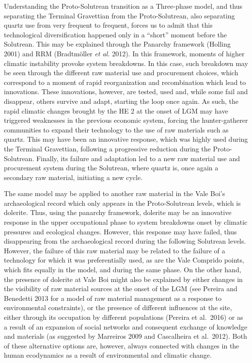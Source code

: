 \documentclass[12pt,twoside]{reedthesis}
\begin{document}
Understanding the Proto-Solutrean transition as a Three-phase model, and thus separating the Terminal Gravettian from the Proto-Solutrean, also separating quartz use from very frequent to frequent, forces us to admit that this technological diversification happened only in a ``short'' moment before the Solutrean. This may be explained through the Panarchy framework (Holling 2001) and RRM (Bradtmöller \emph{et al.} 2012). In this framework, moments of higher climatic instability provoke system breakdowns. In this case, such breakdown may be seen through the different raw material use and procurement choices, which correspond to a moment of rapid reorganization and recombination which lead to innovations. These innovations, however, are tested, used and, while some fail and disappear, others survive and adapt, starting the loop once again. As such, the rapid climatic changes brought by the HE 2 at the onset of LGM may have triggered weaknesses in the previous economic system, forcing the hunter-gatherer communities to expand their technology to the use of raw materials such as quartz. This may have been an innovative response, which was highly used during the Terminal Gravettian, following a progressive reduction during the Proto-Solutrean. Finally, its failure and adaptation led to a new raw material use and procurement system during the Solutrean, where quartz is, once again a secondary raw material, initiating a new cycle.

The same model may be applied to another raw material in the Vale Boi's archaeological record which only appears in the Proto-Solutrean levels, which is dolerite. Thus, using the panarchy framework, dolerite may be an innovative response in the upper occupational phase to system breakdowns onset by climatic pressures and ecological changes. However, this response may have failed, thus disappearing from the archaeological record during the following Solutrean levels. However, the failure of this raw material may be related to the failure of a technology for which it was preferentially used, as are the Vale Comprido points, which fits equally in the model, and during the same phase. On the other hand, the presence of dolerite at Vale Boi might also be explained by either changes in the visibility of raw material sources at the onset of the LGM (see Pereira and Benedetti 2013 for a model of raw material management as a response to environmental constraints), or the presence of different influences at the site, either through its occupation by different populations (Pereira et al.~2016) or as a result of an expansion of social networks and consequent exchange of knowledge and materials (as suggested by Marreiros 2009 and Cascalheira et al.~2012). Both of these alternative options are, however, always connected with changes in the human ecodynamics as a result of environmental and climatic change.
\end{document}
